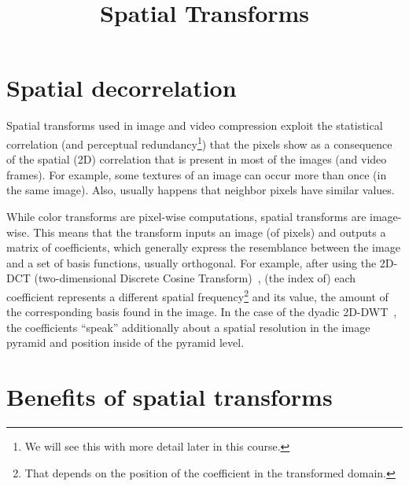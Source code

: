 
\title{Spatial Transforms}

\maketitle

\tableofcontents

\section{Spatial decorrelation}

Spatial transforms used in image and video compression exploit the
statistical correlation (and perceptual redundancy\footnote{We will
  see this with more detail later in this course.}) that the pixels
show as a consequence of the spatial (2D) correlation that is present
in most of the images (and video frames). For example, some textures of
an image can occur more than once (in the same image). Also, usually
happens that neighbor pixels have similar values.

While color transforms are pixel-wise computations, spatial transforms
are image-wise. This means that the transform inputs an image (of
pixels) and outputs a matrix of coefficients, which generally express
the resemblance between the image and a set of basis functions,
usually orthogonal. For example, after using the 2D-DCT
(two-dimensional Discrete Cosine Transform)~\cite{vruiz__DCT}, (the
index of) each coefficient represents a different spatial
frequency\footnote{That depends on the position of the coefficient in
  the transformed domain.} and its value, the amount of the
corresponding basis found in the image. In the case of the dyadic
2D-DWT~\cite{vruiz__DWT}, the coefficients ``speak'' additionally
about a spatial resolution in the image pyramid and position inside of
the pyramid level.


\section{Benefits of spatial transforms}

